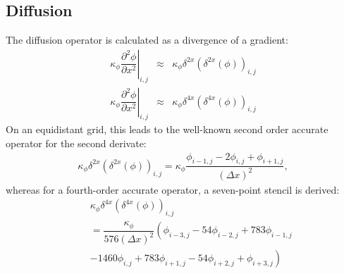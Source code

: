 \documentclass[gmd]{copernicus}
\begin{document}
\subsection{Diffusion}
The diffusion operator is calculated as a divergence of a gradient:
\begin{eqnarray}
\left. \kappa_\phi \dfrac{\partial^2 \phi}{\partial x^2}\right|_{i,j} & \approx &
\kappa_\phi \delta^{2x} \left( \delta^{2x} \left( \phi \right) \right)_{i,j}\\
\left. \kappa_\phi \dfrac{\partial^2 \phi}{\partial x^2}\right|_{i,j} & \approx &
\kappa_\phi \delta^{4x} \left( \delta^{4x} \left( \phi \right) \right)_{i,j}
\end{eqnarray}
On an equidistant grid, this leads to the well-known second order accurate operator for the second derivate:
\begin{eqnarray}
\kappa_\phi \delta^{2x} \left( \delta^{2x} \left( \phi \right) \right)_{i,j} =
\kappa_\phi \dfrac{ \phi_{i-1,j} - 2 \phi_{i,j} + \phi_{i+1,j} }{\left( \Delta x \right)^2},
\end{eqnarray}
whereas for a fourth-order accurate operator, a seven-point stencil is derived:
\begin{eqnarray}
\nonumber
&& \kappa_\phi \delta^{4x} \left( \delta^{4x} \left( \phi \right) \right)_{i,j}\\
\nonumber
&& = \dfrac{\kappa_\phi}{576 \left( \Delta x \right)^2} \left( \phi_{i-3,j} - 54 \phi_{i-2,j} + 783 \phi_{i-1,j}\right.\\
&&  \left. - 1460  \phi_{i,j} + 783 \phi_{i+1,j} - 54 \phi_{i+2,j} + \phi_{i+3,j} \right)
\end{eqnarray}

\end{document}
